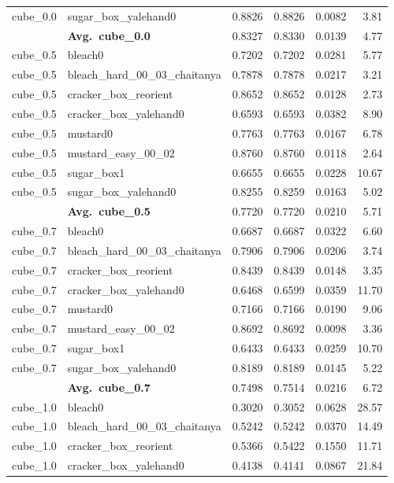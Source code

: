 \begin{longtable}{llrrrr}
  cube_0.0 & sugar\_box\_yalehand0 & 0.8826 & 0.8826 & 0.0082 & 3.81 \\
  \cmidrule{2-6}
  & \textbf{Avg.~cube_0.0} & 0.8327 & 0.8330 & 0.0139 & 4.77 \\
  \midrule
  cube_0.5 & bleach0 & 0.7202 & 0.7202 & 0.0281 & 5.77 \\
  cube_0.5 & bleach\_hard\_00\_03\_chaitanya & 0.7878 & 0.7878 & 0.0217 & 3.21 \\
  cube_0.5 & cracker\_box\_reorient & 0.8652 & 0.8652 & 0.0128 & 2.73 \\
  cube_0.5 & cracker\_box\_yalehand0 & 0.6593 & 0.6593 & 0.0382 & 8.90 \\
  cube_0.5 & mustard0 & 0.7763 & 0.7763 & 0.0167 & 6.78 \\
  cube_0.5 & mustard\_easy\_00\_02 & 0.8760 & 0.8760 & 0.0118 & 2.64 \\
  cube_0.5 & sugar\_box1 & 0.6655 & 0.6655 & 0.0228 & 10.67 \\
  cube_0.5 & sugar\_box\_yalehand0 & 0.8255 & 0.8259 & 0.0163 & 5.02 \\
  \cmidrule{2-6}
  & \textbf{Avg.~cube_0.5} & 0.7720 & 0.7720 & 0.0210 & 5.71 \\
  \midrule
  cube_0.7 & bleach0 & 0.6687 & 0.6687 & 0.0322 & 6.60 \\
  cube_0.7 & bleach\_hard\_00\_03\_chaitanya & 0.7906 & 0.7906 & 0.0206 & 3.74 \\
  cube_0.7 & cracker\_box\_reorient & 0.8439 & 0.8439 & 0.0148 & 3.35 \\
  cube_0.7 & cracker\_box\_yalehand0 & 0.6468 & 0.6599 & 0.0359 & 11.70 \\
  cube_0.7 & mustard0 & 0.7166 & 0.7166 & 0.0190 & 9.06 \\
  cube_0.7 & mustard\_easy\_00\_02 & 0.8692 & 0.8692 & 0.0098 & 3.36 \\
  cube_0.7 & sugar\_box1 & 0.6433 & 0.6433 & 0.0259 & 10.70 \\
  cube_0.7 & sugar\_box\_yalehand0 & 0.8189 & 0.8189 & 0.0145 & 5.22 \\
  \cmidrule{2-6}
  & \textbf{Avg.~cube_0.7} & 0.7498 & 0.7514 & 0.0216 & 6.72 \\
  \midrule
  cube_1.0 & bleach0 & 0.3020 & 0.3052 & 0.0628 & 28.57 \\
  cube_1.0 & bleach\_hard\_00\_03\_chaitanya & 0.5242 & 0.5242 & 0.0370 & 14.49 \\
  cube_1.0 & cracker\_box\_reorient & 0.5366 & 0.5422 & 0.1550 & 11.71 \\
  cube_1.0 & cracker\_box\_yalehand0 & 0.4138 & 0.4141 & 0.0867 & 21.84 \\

\end{longtable}
